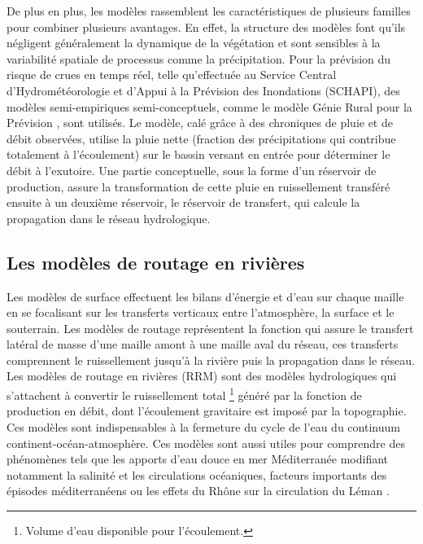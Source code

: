 De plus en plus, les modèles rassemblent les caractéristiques de plusieurs familles pour combiner plusieurs avantages. En effet, la structure des modèles font qu'ils négligent généralement la dynamique de la végétation et sont sensibles à la variabilité spatiale de processus comme la précipitation. Pour la prévision du risque de crues en temps réel, telle qu'effectuée au Service Central d'Hydrométéorologie et d'Appui à la Prévision des Inondations (SCHAPI), des modèles semi-empiriques semi-conceptuels, comme le modèle Génie Rural pour la Prévision \citep[GRP,][]{tangara2005,berthet2010}, sont utilisés. Le modèle, calé grâce à des chroniques de pluie et de débit observées, utilise la pluie nette (fraction des précipitations qui contribue totalement à l'écoulement) sur le bassin versant en entrée pour déterminer le débit à l'exutoire. Une partie conceptuelle, sous la forme d'un réservoir de production, assure la transformation de cette pluie en ruissellement transféré ensuite à un deuxième réservoir, le réservoir de transfert, qui calcule la propagation dans le réseau hydrologique.

\subsection{{\selectfont Les modèles de routage en rivières}}

Les modèles de surface effectuent les bilans d'énergie et d'eau sur chaque maille en se focalisant sur les transferts verticaux entre l'atmosphère, la surface et le souterrain. Les modèles de routage représentent la fonction qui assure le transfert latéral de masse d'une maille amont à une maille aval du réseau, ces transferts comprennent le ruissellement jusqu'à la rivière puis la propagation dans le réseau. Les modèles de routage en rivières (RRM) sont des modèles hydrologiques qui s'attachent à convertir le ruissellement total \footnote{Volume d'eau disponible pour l'écoulement.} généré par la fonction de production en débit, dont l'écoulement gravitaire est imposé par la topographie. Ces modèles sont indispensables à la fermeture du cycle de l'eau du continuum continent-océan-atmosphère. Ces modèles sont aussi utiles pour comprendre des phénomènes tels que les apports d'eau douce en mer Méditerranée modifiant notamment la salinité et les circulations océaniques, facteurs importants des épisodes méditerranéens \citep{sauvage2018} ou les effets du Rhône sur la circulation du Léman \citep{halder2013}. \\ 

